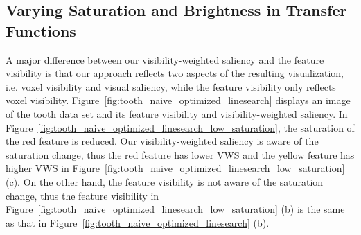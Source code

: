 \subsection{Varying Saturation and Brightness in Transfer Functions}
A major difference between our visibility-weighted saliency and the feature visibility is that our approach reflects two aspects of the resulting visualization, i.e. voxel visibility and visual saliency, while the feature visibility only reflects voxel visibility.
Figure~\ref{fig:tooth_naive_optimized_linesearch} displays an image of the tooth data set and its feature visibility and visibility-weighted saliency.
In Figure~\ref{fig:tooth_naive_optimized_linesearch_low_saturation}, the saturation of the red feature is reduced. Our visibility-weighted saliency is aware of the saturation change, thus the red feature has lower VWS and the yellow feature has higher VWS in Figure~\ref{fig:tooth_naive_optimized_linesearch_low_saturation} (c).
On the other hand, the feature visibility is not aware of the saturation change, thus the feature visibility in Figure~\ref{fig:tooth_naive_optimized_linesearch_low_saturation} (b) is the same as that in Figure~\ref{fig:tooth_naive_optimized_linesearch} (b).

